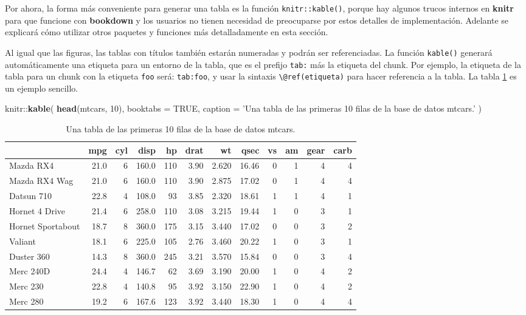 \documentclass[12pt,]{krantz}
\makeatletter
\newenvironment{Shaded}{\begin{snugshade}}{\end{snugshade}}
\newcommand{\KeywordTok}[1]{\textcolor[rgb]{0.13,0.29,0.53}{\textbf{{#1}}}}
\newcommand{\DataTypeTok}[1]{\textcolor[rgb]{0.13,0.29,0.53}{{#1}}}
\newcommand{\DecValTok}[1]{\textcolor[rgb]{0.00,0.00,0.81}{{#1}}}
\newcommand{\StringTok}[1]{\textcolor[rgb]{0.31,0.60,0.02}{{#1}}}
\newcommand{\OtherTok}[1]{\textcolor[rgb]{0.56,0.35,0.01}{{#1}}}
\newcommand{\NormalTok}[1]{{#1}}
\newenvironment{kframe}{%
\medskip{}
\setlength{\fboxsep}{.8em}
 \def\at@end@of@kframe{}%
 \ifinner\ifhmode%
  \def\at@end@of@kframe{\end{minipage}}%
  \begin{minipage}{\columnwidth}%
 \fi\fi%
 \def\FrameCommand##1{\hskip\@totalleftmargin \hskip-\fboxsep
 \colorbox{shadecolor}{##1}\hskip-\fboxsep
     \hskip-\linewidth \hskip-\@totalleftmargin \hskip\columnwidth}%
 \MakeFramed {\advance\hsize-\width
   \@totalleftmargin\z@ \linewidth\hsize
   \@setminipage}}%
 {\par\unskip\endMakeFramed%
 \at@end@of@kframe}
\renewenvironment{Shaded}{\begin{kframe}}{\end{kframe}}
\theoremstyle{definition}
\theoremstyle{definition}
\theoremstyle{remark}
\makeatother
\begin{document}
Por ahora, la forma más conveniente para generar una tabla es la función
\texttt{knitr::kable()}, porque hay algunos trucos internos en
\textbf{knitr} para que funcione con \textbf{bookdown} y los usuarios no
tienen necesidad de preocuparse por estos detalles de implementación.
Adelante se explicará cómo utilizar otros paquetes y funciones más
detalladamente en esta sección.

Al igual que las figuras, las tablas con títulos también estarán
numeradas y podrán ser referenciadas. La función \texttt{kable()}
generará automáticamente una etiqueta para un entorno de la tabla, que
es el prefijo \texttt{tab:} más la etiqueta del chunk. Por ejemplo, la
etiqueta de la tabla para un chunk con la etiqueta \texttt{foo} será:
\texttt{tab:foo}, y usar la sintaxis
\texttt{\textbackslash{}@ref(etiqueta)} para hacer referencia a la
tabla. La tabla \ref{tab:table-single} es un ejemplo sencillo.

\begin{Shaded}
\begin{Highlighting}[]
\NormalTok{knitr::}\KeywordTok{kable}\NormalTok{(}
  \KeywordTok{head}\NormalTok{(mtcars, }\DecValTok{10}\NormalTok{), }\DataTypeTok{booktabs =} \OtherTok{TRUE}\NormalTok{,}
  \DataTypeTok{caption =} \StringTok{'Una tabla de las primeras 10 filas de la base de datos mtcars.'}
\NormalTok{)}
\end{Highlighting}
\end{Shaded}

\begin{table}

\caption{\label{tab:table-single}Una tabla de las primeras 10 filas de la base de datos mtcars.}
\centering
\begin{tabular}[t]{lrrrrrrrrrrr}
\toprule
  & mpg & cyl & disp & hp & drat & wt & qsec & vs & am & gear & carb\\
\midrule
Mazda RX4 & 21.0 & 6 & 160.0 & 110 & 3.90 & 2.620 & 16.46 & 0 & 1 & 4 & 4\\
Mazda RX4 Wag & 21.0 & 6 & 160.0 & 110 & 3.90 & 2.875 & 17.02 & 0 & 1 & 4 & 4\\
Datsun 710 & 22.8 & 4 & 108.0 & 93 & 3.85 & 2.320 & 18.61 & 1 & 1 & 4 & 1\\
Hornet 4 Drive & 21.4 & 6 & 258.0 & 110 & 3.08 & 3.215 & 19.44 & 1 & 0 & 3 & 1\\
Hornet Sportabout & 18.7 & 8 & 360.0 & 175 & 3.15 & 3.440 & 17.02 & 0 & 0 & 3 & 2\\
\addlinespace
Valiant & 18.1 & 6 & 225.0 & 105 & 2.76 & 3.460 & 20.22 & 1 & 0 & 3 & 1\\
Duster 360 & 14.3 & 8 & 360.0 & 245 & 3.21 & 3.570 & 15.84 & 0 & 0 & 3 & 4\\
Merc 240D & 24.4 & 4 & 146.7 & 62 & 3.69 & 3.190 & 20.00 & 1 & 0 & 4 & 2\\
Merc 230 & 22.8 & 4 & 140.8 & 95 & 3.92 & 3.150 & 22.90 & 1 & 0 & 4 & 2\\
Merc 280 & 19.2 & 6 & 167.6 & 123 & 3.92 & 3.440 & 18.30 & 1 & 0 & 4 & 4\\
\bottomrule
\end{tabular}
\end{table}
\end{document}
